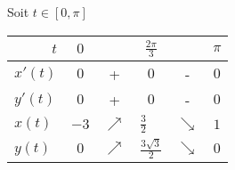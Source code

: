 Soit $t\in[0,\pi]$
\begin{table}[H]
  \centering
  \begin{tabular}{|l|ccccc|}
    \hline
    \multicolumn{1}{|r|}{$t$} & \multicolumn{1}{c}{$0$} &            & $\frac{2\pi}{3}$                          &            & \multicolumn{1}{c|}{$\pi$} \\ \hline
    $x'(t)$                   & $0$                     & +          & $0$                                       & -          & $0$                        \\ \hline
    $y'(t)$                   & $0$                     & +          & $0$                                       & -          & $0$                        \\ \hline
    $x(t)$                    & $-3$                    & $\nearrow$ & \multicolumn{1}{l}{$\frac{3}{2}$}         & $\searrow$ & $1$                        \\ \hline
    $y(t)$                    & $0$                     & $\nearrow$ & \multicolumn{1}{l}{$\frac{3\sqrt{3}}{2}$} & $\searrow$ & $0$                        \\ \hline
  \end{tabular}
\end{table}

